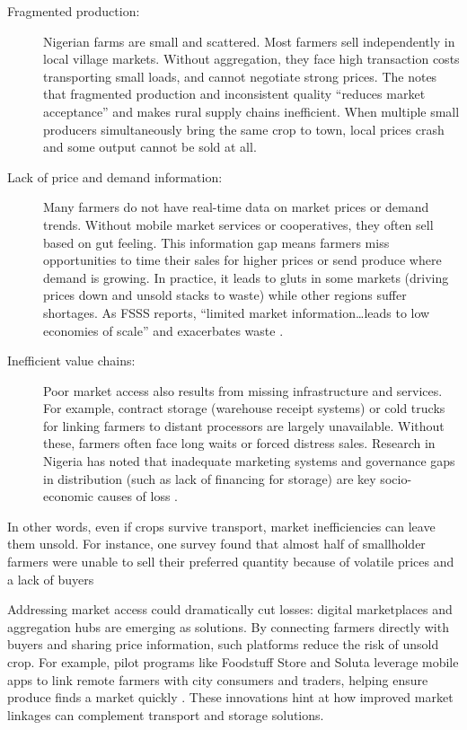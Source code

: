 {\begin{description}
\item[Fragmented production:] Nigerian farms are small and scattered. Most farmers sell independently in local village markets. Without aggregation, they face high transaction costs transporting small loads, and cannot negotiate strong prices. The \citet{FarmSupportSolutions2025} notes that fragmented production and inconsistent quality “reduces market acceptance” and makes rural supply chains inefficient. When multiple small producers simultaneously bring the same crop to town, local prices crash and some output cannot be sold at all.

\item[Lack of price and demand information:] Many farmers do not have real-time data on market prices or demand trends. Without mobile market services or cooperatives, they often sell based on gut feeling. This information gap means farmers miss opportunities to time their sales for higher prices or send produce where demand is growing. In practice, it leads to gluts in some markets (driving prices down and unsold stacks to waste) while other regions suffer shortages. As FSSS reports, “limited market information…leads to low economies of scale” and exacerbates waste \citep{FarmSupportSolutions2025}.

\item[Inefficient value chains:] Poor market access also results from missing infrastructure and services. For example, contract storage (warehouse receipt systems) or cold trucks for linking farmers to distant processors are largely unavailable. Without these, farmers often face long waits or forced distress sales. Research in Nigeria has noted that inadequate marketing systems and governance gaps in distribution (such as lack of financing for storage) are key socio-economic causes of loss \citep{Ogundele2022}.
\end{description}

In other words, even if crops survive transport, market inefficiencies can leave them unsold. For instance, one survey found that almost half of smallholder farmers were unable to sell their preferred quantity because of volatile prices and a lack of buyers
\vspace{\myvspace}

Addressing market access could dramatically cut losses: digital marketplaces and aggregation hubs are emerging as solutions. By connecting farmers directly with buyers and sharing price information, such platforms reduce the risk of unsold crop. For example, pilot programs like Foodstuff Store and Soluta leverage mobile apps to link remote farmers with city consumers and traders, helping ensure produce finds a market quickly \citep{Tenebe2024, FarmSupportSolutions2025}. These innovations hint at how improved market linkages can complement transport and storage solutions.

}
